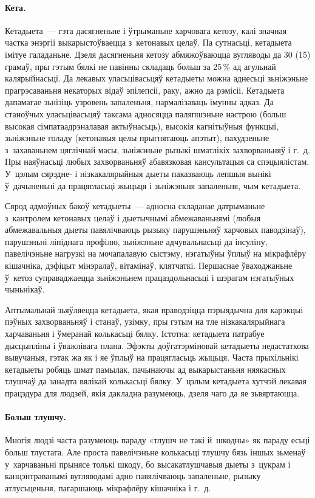 \paragraph{Кета.}
Кетадыета~--- гэта дасягненьне і ўтрыманьне харчовага кетозу, калі значная частка энэргіі выкарыстоўваецца з~кетонавых целаў. Па сутнасьці, кетадыета імітуе галаданьне. Дзеля дасягненьня кетозу абмяжоўваюцца вугляводы да 30 (15) грамаў, пры гэтым бялкі не павінны складаць больш за 25\,\% ад агульнай калярыйнасьці. Да лекавых уласьцівасьцяў кетадыеты можна аднесьці зьніжэньне прагрэсаваньня некаторых відаў эпілепсіі, раку, ажно да рэмісіі. Кетадыета дапамагае зьнізіць узровень запаленьня, нармалізаваць імунны адказ. Да станоўчых уласьцівасьцяў таксама адносяцца паляпшэньне настрою (больш высокая сімпатаадрэналавая актыўнасьць), высокія кагнітыўныя функцыі, зьніжэньне голаду (кетонавыя целы прыгнятаюць апэтыт), пахудзеньне з~захаваньнем цяглічнай масы, зьніжэньне рызыкі шматлікіх захворваньняў і г.~д. Пры наяўнасьці любых захворваньняў абавязковая кансультацыя са спэцыялістам. У~цэлым сярэдне- і нізкакалярыйныя дыеты паказваюць лепшыя вынікі ў~дачыненьні да працягласьці жыцьця і зьніжэньня запаленьня, чым кетадыета.


Сярод адмоўных бакоў кетадыеты~--- адносна складанае датрыманьне з~кантролем кетонавых целаў і дыетычнымі абмежаваньнямі (любыя абмежавальныя дыеты павялічваюць рызыку парушэньняў харчовых паводзінаў), парушэньні ліпіднага профілю, зьніжэньне адчувальнасьці да інсуліну, павелічэньне нагрузкі на мочапалавую сыстэму, нэгатыўны ўплыў на мікрафлёру кішачніка, дэфіцыт мінэралаў, вітамінаў, клятчаткі. Першаснае ўваходжаньне ў~кетоз суправаджаецца зьніжэньнем працаздольнасьці і шэрагам нэгатыўных чыньнікаў.

Аптымальнай зьяўляецца кетадыета, якая праводзіцца пэрыядычна для карэкцыі пэўных захворваньняў і станаў, узімку, пры гэтым на тле нізкакалярыйнага харчаваньня і ўмеранай колькасьці бялку. Істотна: кетадыета патрабуе дысцыпліны і ўважлівага плана. Эфэкты доўгатэрміновай кетадыеты недастаткова вывучаныя, гэтак жа як і яе ўплыў на працягласьць жыцьця. Часта прыхільнікі кетадыеты робяць шмат памылак, пачынаючы ад выкарыстаньня няякасных тлушчаў да занадта вялікай колькасьці бялку. У~цэлым кетадыета хутчэй лекавая працэдура для людзей, якія дакладна разумеюць, дзеля чаго да яе зьвяртаюцца.

\paragraph{Больш тлушчу.}
Многія людзі часта разумеюць параду «тлушч не такі й~шкодны» як параду есьці больш тлустага. Але проста павелічэньне колькасьці тлушчу бязь іншых зьменаў у~харчаваньні прынясе толькі шкоду, бо высакатлушчавыя дыеты з~цукрам і канцэнтраванымі вугляводамі адно павялічваюць запаленьне, рызыку атлусьценьня, пагаршаюць мікрафлёру кішачніка і г.~д.
